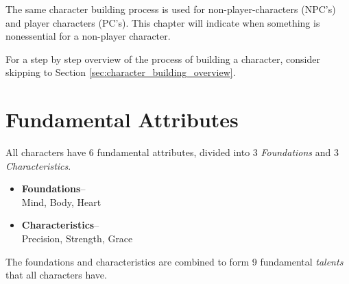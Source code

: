 
The same character building process is used for non-player-characters (NPC's) and player characters (PC's). This chapter will indicate when something is nonessential for a non-player character.

For a step by step overview of the process of building a character, consider skipping to Section \ref{sec:character_building_overview}.
\vspace{3\baselineskip}

\section{Fundamental Attributes}

All characters have 6 fundamental attributes, divided into 3 \emph{Foundations} and 3 \emph{Characteristics}.

\begin{itemize}
\item \textbf{Foundations}-- \\ Mind, Body, Heart
\item \textbf{Characteristics}-- \\ Precision, Strength, Grace
\end{itemize}

The foundations and characteristics are combined to form 9 fundamental \emph{talents} that all characters have.

